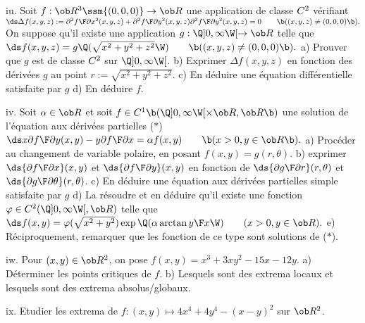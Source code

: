 \exo [Level=2,Fight=2,Learn=2,Type=\TravauxDirigés,Field=\EquationsAuxDérivéesPartielles,Origin=] iu. 
Soit $f:\ob R^3\ssm\{(0,0,0)\}\to\ob R$ une application de classe $\sc C^2$ 
vérifiant 
\medskip\hfill$\ds 
\Delta f(x,y,z):={\partial^2f\F\partial x^2}(x,y,z)
+{\partial^2f\F\partial y^2}(x,y,z){\partial^2f\F\partial y^2}(x,y,z)=0\qquad\b((x,y,z)\neq(0,0,0)\b). 
$\hfill\null\medskip\noindent
On suppose qu'il existe une application $g:\Q]0,\infty\W[\to\ob R$ telle que 
\medskip\hfill$\ds 
f(x,y,z)=g\Q(\sqrt{x^2+y^2+z^2}\W)\qquad\b((x,y,z)\neq(0,0,0)\b).
$\hfill\null\medskip\noindent
a) Prouver que $g$ est de classe $\sc C^2$ sur $\Q]0,\infty\W[$. \smallskip
\noindent
b) Exprimer $\Delta f(x,y,z)$ en fonction des dérivées $g$ au point $r:=\sqrt{x^2+y^2+z^2}$. 
\smallskip\noindent 
c) En déduire une équation différentielle satisfaite par $g$
\smallskip\noindent
d) En déduire $f$. 

\exo [Level=2,Fight=2,Learn=2,Type=\TravauxDirigés,Field=\EquationsAuxDérivéesPartielles,Origin=] iv. 
Soit $\alpha\in\ob R$ et soit $f\in\sc C^1\b(\Q]0,\infty\W[\times\ob R,\ob R\b)$ une solution 
de l'équation aux dérivées partielles 
\medskip\noindent($*$)\hfill$\ds 
x{\partial f\F\partial y}(x,y)-y{\partial f\F\partial x}=\alpha f(x,y)\qquad\b(x>0,y\in\ob R\b).
$\hfill\null\medskip\noindent 
a) Procéder au changement de variable polaire, en posant $f(x,y)=g(r,\theta)$. 
\medskip\noindent
b) exprimer $\ds{\partial f\F\partial x}(x,y)$ et $\ds{\partial f\F\partial y}(x,y)$ en fonction de 
$\ds{\partial g\F\partial r}(r,\theta)$ et $\ds{\partial g\F\partial\theta}(r,\theta)$. 
\medskip\noindent
c) En déduire une équation aux dérivées partielles simple satisfaite par $g$
\medskip\noindent
d) La résoudre et en déduire qu'il existe 
une fonction $\varphi\in\sc C^2(\Q]0,\infty\W[,\ob R)$ telle que 
\medskip\hfill$\ds 
f(x,y)=\varphi(\sqrt{x^2+y^2})\exp\Q(\alpha\arctan{y\F x}\W)\qquad(x>0,y\in\ob R). 
$\hfill\null\medskip\noindent 
e) Réciproquement, remarquer que les fonction de ce type sont solutions de ($*$). 

\exo [Level=2,Fight=1,Learn=1,Type=\Exercices,Field=\Extrema,Origin=] iw. 
Pour $(x,y)\in\ob R^2$, on pose $f(x,y)=x^3+3xy^2-15x-12y$. \pn
a) Déterminer les points critiques de $f$. \pn
b) Lesquels sont des extrema locaux et lesquels 
sont des extrema absolus/globaux. 

\exo [Level=2,Fight=1,Learn=1,Type=\Exercices,Field=\Extrema,Origin=] ix. 
Etudier les extrema de $f:(x,y)\mapsto 4x^4+4y^4-(x-y)^2$ sur $\ob R^2$. 

